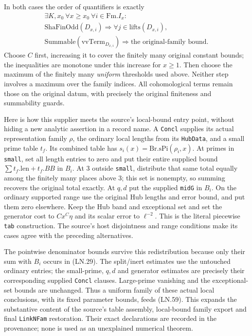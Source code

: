In both cases the order of quantifiers is exactly
\[
 \begin{gathered}
 \exists K,x_0\ \forall x\ge x_0\ \forall i\in\mathrm{Fm}.I_x:\\
 \mathrm{ShaFinOdd}(D_{x,i})\Longrightarrow
 \forall j\in\mathrm{lifts}(D_{x,i}),\\
 \mathrm{Summable}(\mathrm{vvTerm}_{D_{x,i}})
           \Longrightarrow\text{the original-family bound}.
 \end{gathered}
 \tag{LN.59}
\]
Choose $C$ first, increasing it to cover the finitely many original
constant bounds; the inequalities are monotone under this increase
for $x\ge1$.  Then choose the maximum of the finitely many
\emph{uniform} thresholds used above.  Neither step involves a
maximum over the family indices.  All cohomological terms remain
those on the original datum, with precisely the original finiteness
and summability guards.

Here is how this supplier meets the source's local-bound entry
point, without hiding a new analytic assertion in a record name.
A \texttt{Concl} supplies its actual representation family $\rho$,
the ordinary local lengths from its \texttt{HubData}, and a small
prime table $t_f$.  Its combined table has
$s_i(x)=\mathrm{Br.sPi}(\rho_i,x)$.  At primes in
\texttt{small}, set all length entries to zero and put their entire
supplied bound $\sum t_f.\mathrm{len}+t_f.BB$ in $B_i$.
At $3$ outside \texttt{small}, distribute that same total equally
among the finitely many places above $3$; this set is nonempty,
so summing recovers the original total exactly.  At $q,d$ put
the supplied \texttt{midG} in $B_i$.  On the ordinary supported
range use the original Hub lengths and error bound, and put them
zero elsewhere.  Keep the Hub band and exceptional set and set
the generator cost to $Cx^C\eta$ and its scalar error to
$\ell^{-2}$.  This is the literal piecewise \texttt{tab}
construction.  The source's host disjointness and range conditions
make its cases agree with the preceding alternatives.

The pointwise denominator bounds survive this redistribution
because only their sum with $B_i$ occurs in (LN.29).
The split/inert estimates use the untouched ordinary entries;
the small-prime, $q,d$ and generator estimates are precisely their
corresponding supplied \texttt{Concl} clauses.  Large-prime
vanishing and the exceptional-set bounds are unchanged.  Thus a
uniform family of these actual local conclusions, with its fixed
parameter bounds, feeds (LN.59).  This expands the substantive
content of the source's table assembly, local-bound family export
and final \texttt{LinkNFam} restoration.  Their exact declarations
are recorded in the provenance; none is used as an unexplained
numerical theorem.

